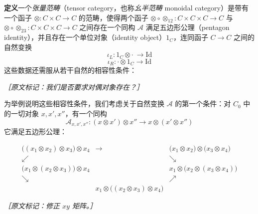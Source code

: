 \textbf{定义}\quad 一个\emph{张量范畴}（tensor category，也称\emph{幺半范畴} monoidal category）是带有一个函子 $\otimes:C\times C\to C$ 的范畴，使得两个函子 $\otimes\circ\otimes_{12}:C\times C\times C\to C$ 与 $\otimes\circ\otimes_{23}:C\times C\times C\to C$ 之间存在一个同构 $\mathcal{A}$ 满足五边形公理（pentagon identity），并且存在一个单位对象（identity object）$1_C$，连同函子 $C\to C$ 之间的自然变换
\begin{equation}
  \iota_L:1_C\otimes\cdot\ \to\mathrm{Id}
  \tag{K.45}
  \label{eq:K.45}
\end{equation}
\begin{equation}
  \iota_R:\cdot\otimes 1_C\to\mathrm{Id}
  \tag{K.46}
  \label{eq:K.46}
\end{equation}
这些数据还需服从若干自然的相容性条件：

{\small\itshape ［原文标记：我们是否要求对偶对象存在？］}

为举例说明这些相容性条件，我们考虑关于自然变换 $\mathcal{A}$ 的第一个条件：对 $C_0$ 中的一切对象 $x,x',x''$，有一个同构
\begin{equation}
  \mathcal{A}_{x,x',x''}:(x\otimes x')\otimes x''\to x\otimes(x'\otimes x'')
  \tag{K.47}
  \label{eq:K.47}
\end{equation}
它满足五边形公理：


{\small
\begin{equation}
\begin{array}{ccc}
\big((x_1\otimes x_2)\otimes x_3\big)\otimes x_4 & \longrightarrow &
\big(x_1\otimes x_2\big)\otimes\big(x_3\otimes x_4\big)\\[10pt]
\swarrow & & \searrow\\[10pt]
\big(x_1\otimes(x_2\otimes x_3)\big)\otimes x_4 & &
x_1\otimes\big(x_2\otimes(x_3\otimes x_4)\big)\\[10pt]
\searrow & & \nearrow\\[10pt]
& x_1\otimes\big((x_2\otimes x_3)\otimes x_4\big) &
\end{array}
\tag{K.48}
\label{eq:K.48}
\end{equation}
}

{\small\itshape ［原文标记：修正 $xy$ 矩阵。］}

